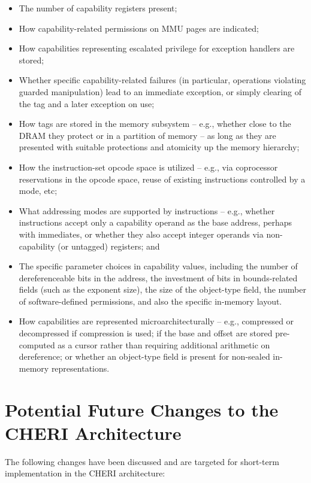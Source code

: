 \begin{itemize}
\item The number of capability registers present;
\item How capability-related permissions on MMU pages are indicated;
\item How capabilities representing escalated privilege for exception
  handlers are stored;
\item Whether specific capability-related failures (in particular, operations
  violating guarded manipulation) lead to an immediate exception, or simply
  clearing of the tag and a later exception on use;
\item How tags are stored in the memory subsystem -- e.g., whether close to
  the DRAM they protect or in a partition of memory -- as long as they are
  presented with suitable protections and atomicity up the memory hierarchy;
\item How the instruction-set opcode space is utilized -- e.g., via
  coprocessor reservations in the opcode space, reuse of existing instructions
  controlled by a mode, etc;
\item What addressing modes are supported by instructions -- e.g., whether
  instructions accept only a capability operand as the base address, perhaps
  with immediates, or whether they also accept integer operands via
  non-capability (or untagged) registers; and
\item The specific parameter choices in capability values, including the
  number of dereferenceable bits in the address, the investment of bits in
  bounds-related fields (such as the exponent size), the size of the
  object-type field, the number of software-defined permissions, and also the
  specific in-memory layout.
\item How capabilities are represented microarchitecturally -- e.g.,
  compressed or decompressed if compression is used; if the base and offset
  are stored pre-computed as a cursor rather than requiring additional
  arithmetic on dereference; or whether an object-type field is present for
  non-sealed in-memory representations.
\end{itemize}

\section{Potential Future Changes to the CHERI Architecture}

The following changes have been discussed and are targeted for short-term
implementation in the CHERI architecture:

